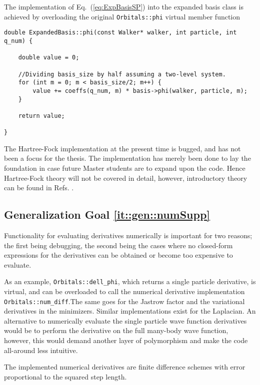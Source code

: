 The implementation of Eq.~(\ref{eq:ExpBasisSP}) into the expanded basis class is achieved by overloading the original \verb+Orbitals::phi+ virtual member function

\vspace{0.5cm}
\begin{lstlisting}
double ExpandedBasis::phi(const Walker* walker, int particle, int q_num) {

    double value = 0;
    
    //Dividing basis_size by half assuming a two-level system.
    for (int m = 0; m < basis_size/2; m++) {
        value += coeffs(q_num, m) * basis->phi(walker, particle, m);
    }

    return value;

}
\end{lstlisting}

The Hartree-Fock implementation at the present time is bugged, and has not been a focus for the thesis. The implementation has merely been done to lay the foundation in case future Master students are to expand upon the code. Hence Hartree-Fock theory will not be covered in detail, however, introductory theory can be found in Refs. \cite{morten, shavitt2009many}.

\subsection{Generalization Goal \ref{it::gen::numSupp}}

Functionality for evaluating derivatives numerically is important for two reasons; the first being debugging, the second being the cases where no closed-form expressions for the derivatives can be obtained or become too expensive to evaluate.

As an example, \verb+Orbitals::dell_phi+, which returns a single particle derivative, is virtual, and can be overloaded to call the numerical derivative implementation \verb+Orbitals::num_diff+.The same goes for the Jastrow factor and the variational derivatives in the minimizers. Similar implementations exist for the Laplacian. An alternative to numerically evaluate the single particle wave function derivatives would be to perform the derivative on the full many-body wave function, however, this would demand another layer of polymorphism and make the code all-around less intuitive. 

The implemented numerical derivatives are finite difference schemes with error proportional to the squared step length.

